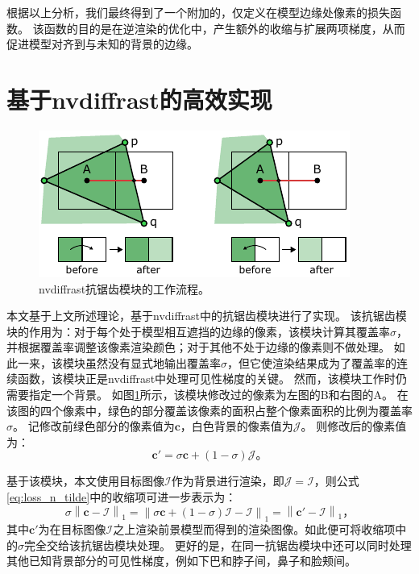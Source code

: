 
根据以上分析，我们最终得到了一个附加的，仅定义在模型边缘处像素的损失函数。
该函数的目的是在逆渲染的优化中，产生额外的收缩与扩展两项梯度，从而促进模型对齐到与未知的背景的边缘。

\section{基于nvdiffrast的高效实现}

\begin{figure}[ht]
    \centering
    \includegraphics{figures/antialias}
    \caption[nvdiffrast抗锯齿模块的工作流程]{nvdiffrast抗锯齿模块的工作流程\citep{nvdiffrast}。}
    \label{fig:aa}
\end{figure}
本文基于上文所述理论，基于nvdiffrast\citep{nvdiffrast}中的抗锯齿模块进行了实现。
该抗锯齿模块的作用为：对于每个处于模型相互遮挡的边缘的像素，该模块计算其覆盖率$\sigma$，并根据覆盖率调整该像素渲染颜色；对于其他不处于边缘的像素则不做处理。
如此一来，该模块虽然没有显式地输出覆盖率$\sigma$，但它使渲染结果成为了覆盖率的连续函数，该模块正是nvdiffrast中处理可见性梯度的关键。
然而，该模块工作时仍需要指定一个背景。
如图\ref{fig:aa}所示，该模块修改过的像素为左图的B和右图的A。
在该图的四个像素中，绿色的部分覆盖该像素的面积占整个像素面积的比例为覆盖率$\sigma$。
记修改前绿色部分的像素值为$\mathbf{c}$，白色背景的像素值为$\mathcal{J}$。
则修改后的像素值为：
\begin{equation}
\mathbf{c}' = \sigma\mathbf{c} + (1-\sigma)\mathcal{J}
\text{。}
\end{equation}

基于该模块，本文使用目标图像$\mathcal{I}$作为背景进行渲染，即$\mathcal{J}=\mathcal{I}$，则公式\eqref{eq:loss_n_tilde}中的收缩项可进一步表示为：
\begin{equation}
\sigma\left\| \mathbf{c} - \mathcal{I} \right\|_1 =
\left\| \sigma\mathbf{c} + (1-\sigma)\mathcal{I} - \mathcal{I} \right\|_1 =
\left\| \mathbf{c}' - \mathcal{I} \right\|_1
\text{，}
\label{eq:impl_nvdiffrast}
\end{equation}
其中$\mathbf{c}'$为在目标图像$\mathcal{I}$之上渲染前景模型而得到的渲染图像。如此便可将收缩项中的$\sigma$完全交给该抗锯齿模块处理。
更好的是，在同一抗锯齿模块中还可以同时处理其他已知背景部分的可见性梯度，例如下巴和脖子间，鼻子和脸颊间。

